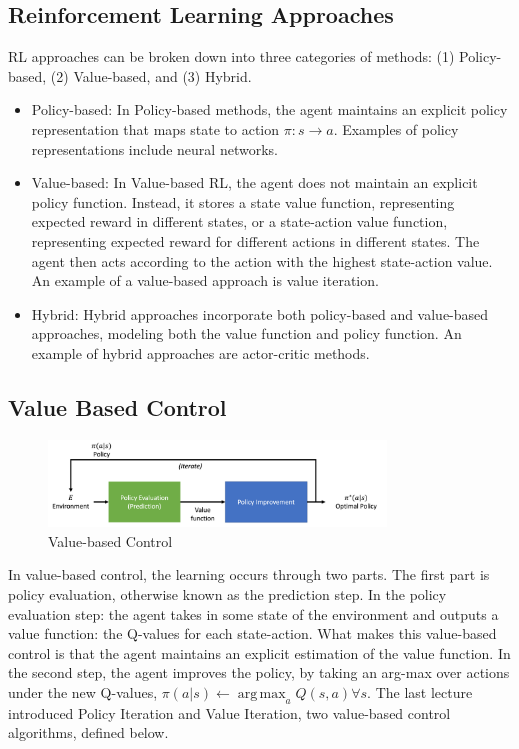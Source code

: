 \documentclass[11pt]{article}
\DeclareMathOperator*{\argmax}{arg\,max}
\begin{document}
\subsection{Reinforcement Learning Approaches}
RL approaches can be broken down into three categories of methods: (1) Policy-based, (2) Value-based, and (3) Hybrid. 
\begin{itemize}
    \item Policy-based: In Policy-based methods, the agent maintains an explicit policy representation that maps state to action $\pi: s \rightarrow a$. Examples of policy representations include neural networks. 
    \item Value-based: In Value-based RL, the agent does not maintain an explicit policy function. Instead, it stores a state value function, representing expected reward in different states, or a state-action value function, representing expected reward for different actions in different states. The agent then acts according to the action with the highest state-action value. An example of a value-based approach is value iteration. 
    \item Hybrid: Hybrid approaches incorporate both policy-based and value-based approaches, modeling both the value function and policy function. An example of hybrid approaches are actor-critic methods.
\end{itemize}

\subsection{Value Based Control}
\begin{figure}[H]
    \centering
    \includegraphics[width=0.8\textwidth]{images/value_based_control.png}
    \caption{Value-based Control}
    \label{fig:vbc}
\end{figure}

In value-based control, the learning occurs through two parts. The first part is policy evaluation, otherwise known as the prediction step. In the policy evaluation step: the agent takes in some state of the environment and outputs a value function: the Q-values for each state-action. What makes this value-based control is that the agent maintains an explicit estimation of the value function. In the second step, the agent improves the policy, by taking an arg-max over actions under the new Q-values, $\pi(a|s) \leftarrow \argmax_a Q(s,a) \forall s$. The last lecture introduced Policy Iteration and Value Iteration, two value-based control algorithms, defined below.
\end{document}
